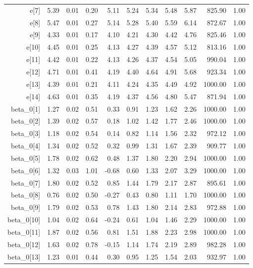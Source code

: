 \begin{longtable}{rrrrrrrrrrr}
  e[7] & 5.39 & 0.01 & 0.20 & 5.11 & 5.24 & 5.34 & 5.48 & 5.87 & 825.90 & 1.00 \\ 
  e[8] & 5.47 & 0.01 & 0.27 & 5.14 & 5.28 & 5.40 & 5.59 & 6.14 & 872.67 & 1.00 \\ 
  e[9] & 4.33 & 0.01 & 0.17 & 4.10 & 4.21 & 4.30 & 4.42 & 4.76 & 825.46 & 1.00 \\ 
  e[10] & 4.45 & 0.01 & 0.25 & 4.13 & 4.27 & 4.39 & 4.57 & 5.12 & 813.16 & 1.00 \\ 
  e[11] & 4.42 & 0.01 & 0.22 & 4.13 & 4.26 & 4.37 & 4.54 & 5.05 & 990.04 & 1.00 \\ 
  e[12] & 4.71 & 0.01 & 0.41 & 4.19 & 4.40 & 4.64 & 4.91 & 5.68 & 923.34 & 1.00 \\ 
  e[13] & 4.39 & 0.01 & 0.21 & 4.11 & 4.24 & 4.35 & 4.49 & 4.92 & 1000.00 & 1.00 \\ 
  e[14] & 4.63 & 0.01 & 0.35 & 4.19 & 4.37 & 4.56 & 4.80 & 5.47 & 871.94 & 1.00 \\ 
  beta_0[1] & 1.27 & 0.02 & 0.51 & 0.33 & 0.91 & 1.23 & 1.62 & 2.26 & 1000.00 & 1.00 \\ 
  beta_0[2] & 1.39 & 0.02 & 0.57 & 0.18 & 1.02 & 1.42 & 1.77 & 2.46 & 1000.00 & 1.00 \\ 
  beta_0[3] & 1.18 & 0.02 & 0.54 & 0.14 & 0.82 & 1.14 & 1.56 & 2.32 & 972.12 & 1.00 \\ 
  beta_0[4] & 1.34 & 0.02 & 0.52 & 0.32 & 0.99 & 1.31 & 1.67 & 2.39 & 909.77 & 1.00 \\ 
  beta_0[5] & 1.78 & 0.02 & 0.62 & 0.48 & 1.37 & 1.80 & 2.20 & 2.94 & 1000.00 & 1.00 \\ 
  beta_0[6] & 1.32 & 0.03 & 1.01 & -0.68 & 0.60 & 1.33 & 2.07 & 3.29 & 1000.00 & 1.00 \\ 
  beta_0[7] & 1.80 & 0.02 & 0.52 & 0.85 & 1.44 & 1.79 & 2.17 & 2.87 & 895.61 & 1.00 \\ 
  beta_0[8] & 0.76 & 0.02 & 0.50 & -0.27 & 0.43 & 0.80 & 1.11 & 1.70 & 1000.00 & 1.00 \\ 
  beta_0[9] & 1.79 & 0.02 & 0.53 & 0.78 & 1.43 & 1.80 & 2.14 & 2.83 & 972.88 & 1.00 \\ 
  beta_0[10] & 1.04 & 0.02 & 0.64 & -0.24 & 0.61 & 1.04 & 1.46 & 2.29 & 1000.00 & 1.00 \\ 
  beta_0[11] & 1.87 & 0.02 & 0.56 & 0.81 & 1.51 & 1.88 & 2.23 & 2.98 & 1000.00 & 1.00 \\ 
  beta_0[12] & 1.63 & 0.02 & 0.78 & -0.15 & 1.14 & 1.74 & 2.19 & 2.89 & 982.28 & 1.00 \\ 
  beta_0[13] & 1.23 & 0.01 & 0.44 & 0.30 & 0.95 & 1.25 & 1.54 & 2.03 & 932.97 & 1.00 \\ 

\end{longtable}
